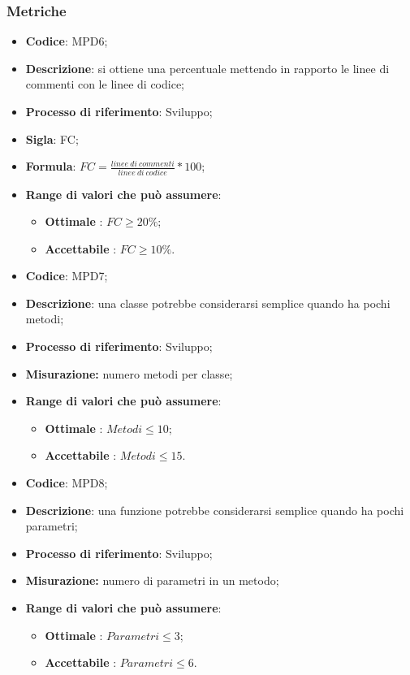 \subsubsection{Metriche}
\vspace{-1cm}
\begin{itemize}
	\item \textbf{Codice}: MPD6;
	\item \textbf{Descrizione}: si ottiene una percentuale mettendo in rapporto le linee di commenti con le linee di codice;
	\item \textbf{Processo di riferimento}: Sviluppo;
	\item \textbf{Sigla}: FC;
	\item \textbf{Formula}: \begin{math}FC=\frac{linee \ di \ commenti}{linee \ di \ codice}*100\end{math};
	\item \textbf{Range di valori che può assumere}: 
		\begin{itemize}
			\item \textbf{Ottimale} : $FC \geq 20 \%$;
			\item \textbf{Accettabile} : $FC \geq 10 \%$.
		\end{itemize}
\end{itemize}
\vspace{-1cm}
\begin{itemize}
	\item \textbf{Codice}: MPD7;
	\item \textbf{Descrizione}: una classe potrebbe considerarsi semplice quando ha pochi metodi;
	\item \textbf{Processo di riferimento}: Sviluppo;
	\item \textbf{Misurazione:} numero metodi per classe;
	\item \textbf{Range di valori che può assumere}: 
		\begin{itemize}
			\item \textbf{Ottimale} : $Metodi \leq 10$;
			\item \textbf{Accettabile} : $Metodi \leq 15$.
		\end{itemize}
\end{itemize}
\vspace{-1cm}
\begin{itemize}
	\item \textbf{Codice}: MPD8;
	\item \textbf{Descrizione}: una funzione potrebbe considerarsi semplice quando ha pochi parametri;
	\item \textbf{Processo di riferimento}: Sviluppo;
	\item \textbf{Misurazione:} numero di parametri in un metodo;
	\item \textbf{Range di valori che può assumere}: 
		\begin{itemize}
			\item \textbf{Ottimale} : $Parametri \leq 3$;
			\item \textbf{Accettabile} : $Parametri \leq 6$.
		\end{itemize}
\end{itemize}

